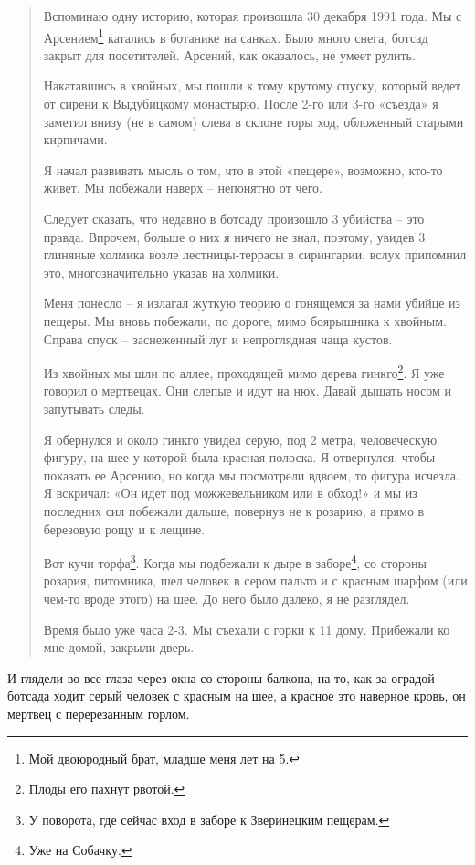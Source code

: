 \begin{quotation}
Вспоминаю одну историю, которая произошла 30 декабря 1991 года. Мы с Арсением\footnote{Мой двоюродный брат, младше меня лет на 5.} катались в ботанике на санках. Было много снега, ботсад закрыт для посетителей. Арсений, как оказалось, не умеет рулить.

Накатавшись в хвойных, мы пошли к тому крутому спуску, который ведет от сирени к Выдубицкому монастырю. После 2-го или 3-го «съезда» я заметил внизу (не в самом) слева в склоне горы ход, обложенный старыми кирпичами.

Я начал развивать мысль о том, что в этой «пещере», возможно, кто-то живет. Мы побежали наверх – непонятно от чего.

Следует сказать, что недавно в ботсаду произошло 3 убийства – это правда. Впрочем, больше о них я ничего не знал, поэтому, увидев 3 глиняные холмика возле лестницы-террасы в сирингарии, вслух припомнил это, многозначительно указав на холмики.

Меня понесло – я излагал жуткую теорию о гонящемся за нами убийце из пещеры. Мы вновь побежали, по дороге, мимо боярышника к хвойным. Справа спуск – заснеженный луг и непроглядная чаща кустов.

Из хвойных мы шли по аллее, проходящей мимо дерева гинкго\footnote{Плоды его пахнут рвотой.}. Я уже говорил о мертвецах. Они слепые и идут на нюх. Давай дышать носом и запутывать следы.

Я обернулся и около гинкго увидел серую, под 2 метра, человеческую фигуру, на шее у которой была красная полоска. Я отвернулся, чтобы показать ее Арсению, но когда мы посмотрели вдвоем, то фигура исчезла. Я вскричал: «Он идет под можжевельником или в обход!» и мы из последних сил побежали дальше, повернув не к розарию, а прямо в березовую рощу и к лещине.

Вот кучи торфа\footnote{У поворота, где сейчас вход в заборе к Зверинецким пещерам.}. Когда мы подбежали к дыре в заборе\footnote{Уже на Собачку.}, со стороны розария, питомника, шел человек в сером пальто и с красным шарфом (или чем-то вроде этого) на шее. До него было далеко, я не разглядел.

Время было уже часа 2-3. Мы съехали с горки к 11 дому. Прибежали ко мне домой, закрыли дверь.
\end{quotation}

И глядели во все глаза через окна со стороны балкона, на то, как за оградой ботсада ходит серый человек с красным на шее, а красное это наверное кровь, он мертвец с перерезанным горлом.

